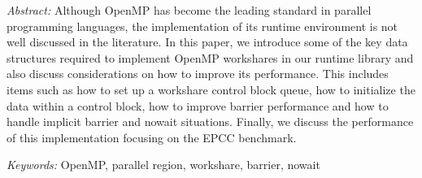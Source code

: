 
\noindent  
\emph{Abstract:} { Although OpenMP has become the leading standard in
  parallel programming languages, the implementation of its runtime
  environment is not well discussed in the literature. In this paper,
  we introduce some of the key data structures required to implement
  OpenMP workshares in our runtime library and also discuss
  considerations on how to improve its performance.  This includes
  items such as how to set up a workshare control block queue, how to
  initialize the data within a control block, how to improve barrier
  performance and how to handle implicit barrier and nowait
  situations. Finally, we discuss the performance of this
  implementation focusing on the EPCC benchmark.}

\vspace{0.5cm}

\noindent
\emph{Keywords:} {\small OpenMP, parallel region, workshare, barrier, nowait}

